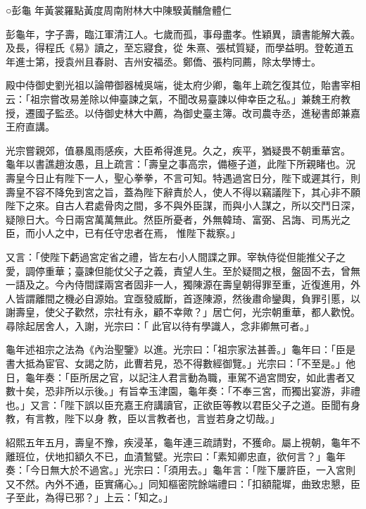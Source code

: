 
\begin{pinyinscope}

 ○彭龜
 年黃裳羅點黃度周南附林大中陳騤黃黼詹體仁



 彭龜年，字子壽，臨江軍清江人。七歲而孤，事母盡孝。性穎異，讀書能解大義。及長，得程氏《易》讀之，至忘寢食，從
 朱熹、張栻質疑，而學益明。登乾道五年進士第，授袁州且春尉、吉州安福丞。鄭僑、張枃同薦，除太學博士。



 殿中侍御史劉光祖以論帶御器械吳端，徙太府少卿，龜年上疏乞復其位，貽書宰相云：「祖宗嘗改易差除以伸臺諫之氣，不聞改易臺諫以伸幸臣之私。」兼魏王府教授，遷國子監丞。以侍御史林大中薦，為御史臺主簿。改司農寺丞，進秘書郎兼嘉王府直講。



 光宗嘗親郊，值暴風雨感疾，大臣希得進見。久之，疾平，猶疑畏不朝重華宮。
 龜年以書譙趙汝愚，且上疏言：「壽皇之事高宗，備極子道，此陛下所親睹也。況壽皇今日止有陛下一人，聖心拳拳，不言可知。特遇過宮日分，陛下或遲其行，則壽皇不容不降免到宮之旨，蓋為陛下辭責於人，使人不得以竊議陛下，其心非不願陛下之來。自古人君處骨肉之間，多不與外臣謀，而與小人謀之，所以交鬥日深，疑隙日大。今日兩宮萬萬無此。然臣所憂者，外無韓琦、富弼、呂誨、司馬光之臣，而小人之中，已有任守忠者在焉，
 惟陛下裁察。」



 又言：「使陛下虧過宮定省之禮，皆左右小人間諜之罪。宰執侍從但能推父子之愛，調停重華；臺諫但能仗父子之義，責望人生。至於疑間之根，盤固不去，曾無一語及之。今內侍間諜兩宮者固非一人，獨陳源在壽皇朝得罪至重，近復進用，外人皆謂離間之機必自源始。宜亟發威斷，首逐陳源，然後肅命鑾輿，負罪引慝，以謝壽皇，使父子歡然，宗社有永，顧不幸歟？」居亡何，光宗朝重華，都人歡悅。尋除起居舍人，入謝，光宗曰：「
 此官以待有學識人，念非卿無可者。」



 龜年述祖宗之法為《內治聖鑒》以進。光宗曰：「祖宗家法甚善。」龜年曰：「臣是書大抵為宦官、女謁之防，此曹若見，恐不得數經御覽。」光宗曰：「不至是。」他日，龜年奏：「臣所居之官，以記注人君言動為職，車駕不過宮問安，如此書者又數十矣，恐非所以示後。」有旨幸玉津園，龜年奏：「不奉三宮，而獨出宴游，非禮也。」又言：「陛下誤以臣充嘉王府講讀官，正欲臣等教以君臣父子之道。臣聞有身教，有言教，陛下以身
 教，臣以言教者也，言豈若身之切哉。」



 紹熙五年五月，壽皇不豫，疾浸革，龜年連三疏請對，不獲命。屬上視朝，龜年不離班位，伏地扣額久不已，血漬鶖甓。光宗曰：「素知卿忠直，欲何言？」龜年奏：「今日無大於不過宮。」光宗曰：「須用去。」龜年言：「陛下屢許臣，一入宮則又不然。內外不通，臣實痛心。」同知樞密院餘端禮曰：「扣額龍墀，曲致忠懇，臣子至此，為得已邪？」上云：「知之。」




\end{pinyinscope}
